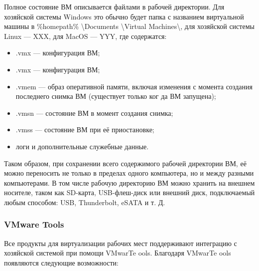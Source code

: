 \documentclass[14pt, a4paper]{article}
\begin{document}
Полное состояние ВМ описывается файлами в рабочей директории. Для хозяйской системы Windows
это обычно будет папка с названием виртуальной машины в \%homepath\% \textbackslash Documents \textbackslash Virtual
Machines\textbackslash, для хозяйской системы Linux — XXX, для MacOS — YYY, где содержатся:

\begin{itemize}
    \item .vmx — конфигурация ВМ;
    \item .vmx — конфигурация ВМ;
    \item .vmem — образ оперативной памяти, включая изменения с момента создания последнего
    снимка ВМ (существует только ког да ВМ запущена);
    \item .vmsn — состояние ВМ в момент создания снимка;
    \item .vmss — состояние ВМ при её приостановке;
    \item логи и дополнительные служебные данные.
\end{itemize}

Таком образом, при сохранении всего содержимого рабочей директории ВМ, её можно переносить не
только в пределах одного компьютера, но и между разными компьютерами. В том числе рабочую
директорию ВМ можно хранить на внешнем носителе, таком как SD-карта, USB-флеш-диск или
внешний диск, подключаемый любым способом: USB, Thunderbolt, eSATA и т. Д.

\subsubsection*{VMware Tools}

Все продукты для виртуализации рабочих мест поддерживают интеграцию с хозяйской системой при
помощи VMwarTe ools. Благодаря VMwarTe ools появляются следующие возможности:
\end{document}
